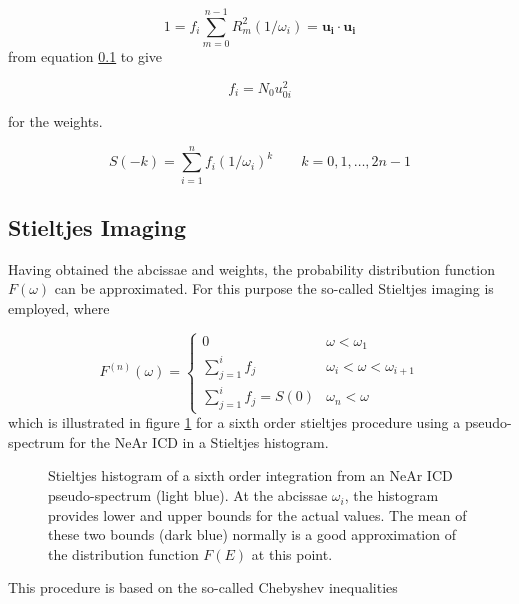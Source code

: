 \begin{equation}
  1 = f_i \sum\limits_{m=0}^{n-1} R_m^2 (1/\omega_i) = \mathbf{u_i} \cdot \mathbf{u_i}
\end{equation}
from equation \ref{} to give

\begin{equation}
  f_i = N_0 u_{0i}^2
\end{equation}

for the weights.

\begin{equation}
  S(-k) = \sum\limits_{i=1}^n f_i (1/\omega_i)^k \quad\quad k=0,1,\dots,2n-1
\end{equation}





\subsection{Stieltjes Imaging}
Having obtained the abcissae and weights, the probability distribution function
$F(\omega)$ can be approximated. For this purpose the so-called Stieltjes imaging
is employed, where

\begin{equation}
  F^{(n)} (\omega) =
  \begin{cases}
    0                                & \omega < \omega_1\\
    \sum\limits_{j=1}^{i} f_j        & \omega_i < \omega < \omega_{i+1}\\
    \sum\limits_{j=1}^{i} f_j = S(0) & \omega_n < \omega 
  \end{cases}
\end{equation}
which is illustrated in figure \ref{figure:stieltjes_imaging} for a sixth
order stieltjes procedure using a pseudo-spectrum for the NeAr ICD in a
Stieltjes histogram.


\begin{figure}[h]
  \centering
  
  \caption{Stieltjes histogram of a sixth order integration from
           an NeAr ICD pseudo-spectrum (light blue). At the abcissae $\omega_i$,
           the histogram provides lower and upper bounds for the actual
           values. The mean of these two bounds (dark blue) normally is a good
           approximation of the distribution function $F(E)$ at this point.}
  \label{figure:stieltjes_imaging}
\end{figure}

This procedure is based on the so-called Chebyshev inequalities

